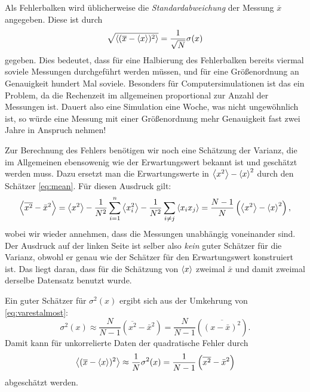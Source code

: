 Als Fehlerbalken wird üblicherweise die \emph{Standardabweichung} der
Messung $\overline{x}$ angegeben. Diese ist durch
\begin{equation}
  \sqrt{\left\langle{(\overline{x} - \left\langle{x}\right\rangle)^2}\right\rangle}
  = \frac{1}{\sqrt{N}}\sigma(x)
\end{equation}
gegeben. Dies bedeutet, dass für eine Halbierung des Fehlerbalken
bereits viermal soviele Messungen durchgeführt werden müssen, und für
eine Größenordnung an Genauigkeit hundert Mal soviele. Besonders für
Computersimulationen ist das ein Problem, da die Rechenzeit im
allgemeinen proportional zur Anzahl der Messungen ist. Dauert also
eine Simulation eine Woche, was nicht ungewöhnlich ist, so würde eine
Messung mit einer Größenordnung mehr Genauigkeit fast zwei Jahre in
Anspruch nehmen!

Zur Berechnung des Fehlers benötigen wir noch eine Schätzung der
Varianz, die im Allgemeinen ebensowenig wie der Erwartungswert bekannt
ist und geschätzt werden muss. Dazu ersetzt man die Erwartungswerte in
$\left\langle{x^2}\right\rangle - \left\langle{x}\right\rangle^2$ durch den Schätzer \eqref{eq:mean}. Für
diesen Ausdruck gilt:
\begin{equation}
  \label{eq:varestalmost}
  \left\langle{\overline{x^2} - \bar{x}^2}\right\rangle
  = \left\langle{x^2}\right\rangle - 
  \frac{1}{N^2}\sum_{i=1}^n \left\langle{x_i^2}\right\rangle
  - \frac{1}{N^2}\sum_{i\neq j} \left\langle{x_ix_j}\right\rangle
  = \frac{N-1}{N}\left(\left\langle{x^2}\right\rangle - \left\langle{x}\right\rangle^2\right),
\end{equation}
wobei wir wieder annehmen, dass die Messungen unabhängig voneinander
sind. Der Ausdruck auf der linken Seite ist selber also \emph{kein} guter
Schätzer für die Varianz, obwohl er genau wie der Schätzer für den
Erwartungswert konstruiert ist. Das liegt daran, dass für die Schätzung
von $\left\langle{x}\right\rangle$ zweimal $\bar{x}$ und damit zweimal derselbe
Datensatz benutzt wurde.

Ein guter Schätzer für $\sigma^2(x)$ ergibt sich aus der Umkehrung von
\eqref{eq:varestalmost}:
\begin{equation}
  \label{eq:varest}
  \sigma^2(x) \approx \frac{N}{N-1}\left(\overline{x^2} -
    \bar{x}^2\right)
  = \frac{N}{N-1}\left(\overline{(x -
      \bar{x})^2}\right).
\end{equation}
Damit kann für unkorrelierte Daten der quadratische Fehler durch
\begin{equation}
  \label{eq:esterr}
  \left\langle{(\overline{x} - \left\langle{x}\right\rangle)^2}\right\rangle
  \approx \frac{1}{N}\sigma^2(x)
  = \frac{1}{N-1}\left(\overline{x^2} - \bar{x}^2\right)
\end{equation}
abgeschätzt werden.

